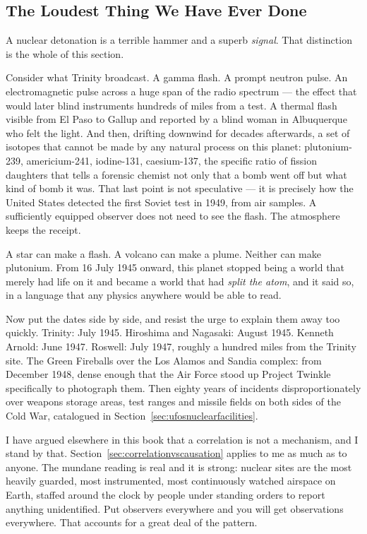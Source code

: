 \subsection{The Loudest Thing We Have Ever Done}\label{sub:loudestthing}

A nuclear detonation is a terrible hammer and a superb \emph{signal}. That distinction is the whole
of this section.

Consider what Trinity broadcast. A gamma flash. A prompt neutron pulse. An electromagnetic pulse
across a huge span of the radio spectrum --- the effect that would later blind instruments hundreds
of miles from a test. A thermal flash visible from El Paso to Gallup and reported by a blind woman in
Albuquerque who felt the light. And then, drifting downwind for decades afterwards, a set of
isotopes that cannot be made by any natural process on this planet: plutonium-239, americium-241,
iodine-131, caesium-137, the specific ratio of fission daughters that tells a forensic chemist not
only that a bomb went off but what kind of bomb it was. That last point is not speculative --- it is
precisely how the United States detected the first Soviet test in 1949, from air samples. A
sufficiently equipped observer does not need to see the flash. The atmosphere keeps the receipt.

 A star can make a flash. A
volcano can make a plume. Neither can make plutonium. From 16 July 1945 onward, this planet stopped
being a world that merely had life on it and became a world that had \emph{split the atom}, and it
said so, in a language that any physics anywhere would be able to read.

Now put the dates side by side, and resist the urge to explain them away too quickly. Trinity: July
1945. Hiroshima and Nagasaki: August 1945. Kenneth Arnold: June 1947. Roswell: July 1947, roughly a
hundred miles from the Trinity site. The Green Fireballs over the Los Alamos and Sandia complex: from
December 1948, dense enough that the Air Force stood up Project Twinkle specifically to photograph
them. Then eighty years of incidents disproportionately over weapons storage areas, test ranges and
missile fields on both sides of the Cold War, catalogued in
Section~\ref{sec:ufosnuclearfacilities}.

I have argued elsewhere in this book that a correlation is not a mechanism, and I stand by that.
Section~\ref{sec:correlationvscausation} applies to me as much as to anyone. The mundane reading is
real and it is strong: nuclear sites are the most heavily guarded, most instrumented, most
continuously watched airspace on Earth, staffed around the clock by people under standing orders to
report anything unidentified. Put observers everywhere and you will get observations everywhere. That
accounts for a great deal of the pattern.

